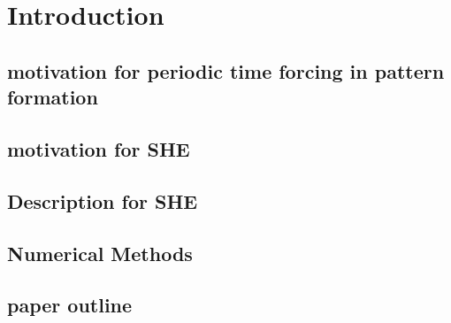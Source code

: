 \documentclass[../main/TimeForcingSHE.tex]{subfiles}
\begin{document}
\section{Introduction}

\subsection{motivation for periodic time forcing in pattern formation}
\subsection{motivation for SHE}
\subsection{Description for SHE}
\subsection{Numerical Methods}
\subsection{paper outline}
\end{document}
